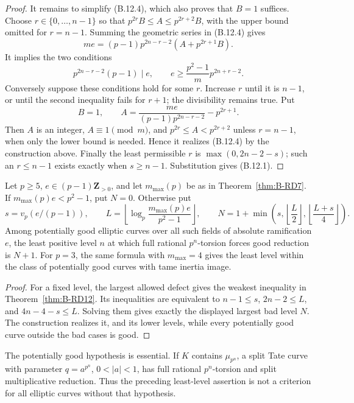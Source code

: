 \begin{proof}
It remains to simplify (B.12.4), which also proves that $B=1$ suffices.
Choose $r\in\{0,\ldots,n-1\}$ so that
$p^{2r}B\leq A\leq p^{2r+2}B$, with the upper bound omitted for
$r=n-1$. Summing the geometric series in (B.12.4) gives
\[
 me=(p-1)p^{2n-r-2}(A+p^{2r+1}B).                \tag{B.12.5}
\]
It implies the two conditions
\[
 p^{2n-r-2}(p-1)\mid e,\qquad
 e\geq \frac{p^2-1}{m}p^{2n+r-2}.                \tag{B.12.6}
\]
Conversely suppose these conditions hold for some $r$. Increase $r$
until it is $n-1$, or until the second inequality fails for $r+1$;
the divisibility remains true. Put
\[
 B=1,\qquad
 A=\frac{me}{(p-1)p^{2n-r-2}}-p^{2r+1}.
\]
Then $A$ is an integer, $A\equiv1\pmod m$, and
$p^{2r}\leq A<p^{2r+2}$ unless $r=n-1$, when only the lower bound
is needed. Hence it realizes (B.12.4) by the construction above.
Finally the least permissible $r$ is
$\max(0,2n-2-s)$; such an $r\leq n-1$ exists exactly when
$s\geq n-1$. Substitution gives (B.12.1).
\end{proof}

\begin{corollary}
\label{cor:B-RD13}
Let $p\geq5$, $e\in(p-1)\mathbf Z_{>0}$, and let $m_{\max}(p)$ be
as in Theorem~\ref{thm:B-RD7}. If $m_{\max}(p)e<p^2-1$, put $N=0$.
Otherwise put
\[
 s=v_p(e/(p-1)),\qquad
 L=\left\lfloor\log_p\frac{m_{\max}(p)e}{p^2-1}\right\rfloor,
 \qquad
 N=1+\min\left(s,\left\lfloor\frac L2\right\rfloor,
                     \left\lfloor\frac{L+s}{4}\right\rfloor\right).
\]
Among potentially good elliptic curves over all such fields of
absolute ramification $e$, the least positive level $n$ at which
full rational $p^n$-torsion forces good reduction is $N+1$.
For $p=3$, the same formula with $m_{\max}=4$ gives the least level
within the class of potentially good curves with tame inertia image.
\end{corollary}
\begin{proof}
For a fixed level, the largest allowed defect gives the weakest
inequality in Theorem~\ref{thm:B-RD12}. Its inequalities are equivalent
to $n-1\leq s$, $2n-2\leq L$, and $4n-4-s\leq L$.
Solving them gives exactly the displayed largest bad level $N$.
The construction realizes it, and its lower levels, while every
potentially good curve outside the bad cases is good.
\end{proof}

\begin{remark}\label{auto:B:b9f011fa8019}

The potentially good hypothesis is essential. If $K$ contains
$\mu_{p^n}$, a split Tate curve with parameter $q=a^{p^n}$,
$0<|a|<1$, has full rational $p^n$-torsion and split multiplicative
reduction. Thus the preceding least-level assertion is not a
criterion for all elliptic curves without that hypothesis.
\end{remark}

